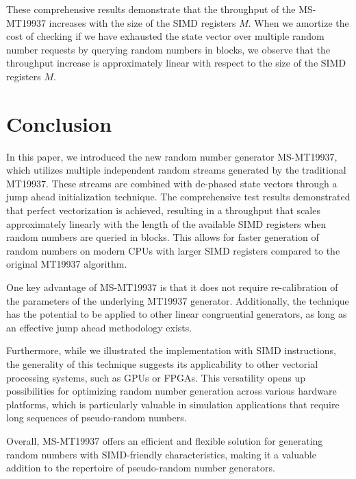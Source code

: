 \documentclass[preprint,1p,times]{elsarticle}
\begin{document}
\noindent These comprehensive results demonstrate that the throughput of the MS-MT19937 increases with the size of the SIMD registers $M$. When we amortize the cost of checking if we have exhausted the state vector over multiple random number requests by querying random numbers in blocks, we observe that the throughput increase is approximately linear with respect to the size of the SIMD registers $M$.

\section{Conclusion}
\noindent In this paper, we introduced the new random number generator MS-MT19937, which utilizes multiple independent random streams generated by the traditional MT19937. These streams are combined with de-phased state vectors through a jump ahead initialization technique. The comprehensive test results demonstrated that perfect vectorization is achieved, resulting in a throughput that scales approximately linearly with the length of the available SIMD registers when random numbers are queried in blocks. This allows for faster generation of random numbers on modern CPUs with larger SIMD registers compared to the original MT19937 algorithm.

\noindent One key advantage of MS-MT19937 is that it does not require re-calibration of the parameters of the underlying MT19937 generator. Additionally, the technique has the potential to be applied to other linear congruential generators, as long as an effective jump ahead methodology exists.

\noindent Furthermore, while we illustrated the implementation with SIMD instructions, the generality of this technique suggests its applicability to other vectorial processing systems, such as GPUs or FPGAs. This versatility opens up possibilities for optimizing random number generation across various hardware platforms, which is particularly valuable in simulation applications that require long sequences of pseudo-random numbers.

\noindent Overall, MS-MT19937 offers an efficient and flexible solution for generating random numbers with SIMD-friendly characteristics, making it a valuable addition to the repertoire of pseudo-random number generators.
\end{document}
